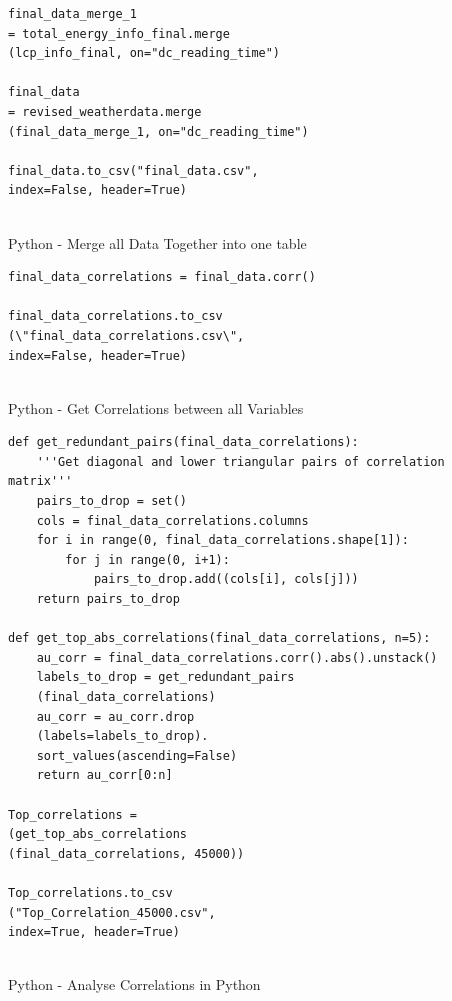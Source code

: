 \documentclass[12pt]{scrartcl}
\begin{document}
\begin{listing}[H]
\begin{verbatim}
final_data_merge_1 
= total_energy_info_final.merge
(lcp_info_final, on="dc_reading_time")

final_data 
= revised_weatherdata.merge
(final_data_merge_1, on="dc_reading_time")

final_data.to_csv("final_data.csv", 
index=False, header=True)


\end{verbatim}
\caption{Python - Merge all Data Together into one table}
\label{list:[Python - Merge all Data Together into one table]}
\end{listing}

\begin{listing}[H]
\begin{verbatim}
final_data_correlations = final_data.corr()

final_data_correlations.to_csv
(\"final_data_correlations.csv\", 
index=False, header=True)


\end{verbatim}
\caption{Python - Get Correlations between all Variables}
\label{list:[Python - Get Correlations between all Variables]}
\end{listing}

\begin{listing}[H]
\begin{verbatim}
def get_redundant_pairs(final_data_correlations):
    '''Get diagonal and lower triangular pairs of correlation matrix'''
    pairs_to_drop = set()
    cols = final_data_correlations.columns
    for i in range(0, final_data_correlations.shape[1]):
        for j in range(0, i+1):
            pairs_to_drop.add((cols[i], cols[j]))
    return pairs_to_drop
    
def get_top_abs_correlations(final_data_correlations, n=5):
    au_corr = final_data_correlations.corr().abs().unstack()
    labels_to_drop = get_redundant_pairs
    (final_data_correlations)
    au_corr = au_corr.drop
    (labels=labels_to_drop).
    sort_values(ascending=False)
    return au_corr[0:n]
    
Top_correlations = 
(get_top_abs_correlations
(final_data_correlations, 45000))

Top_correlations.to_csv
("Top_Correlation_45000.csv", 
index=True, header=True)


\end{verbatim}
\caption{Python - Analyse Correlations in Python}
\label{list:[Python - Analyse Correlations in Python]}
\end{listing}
\end{document}
